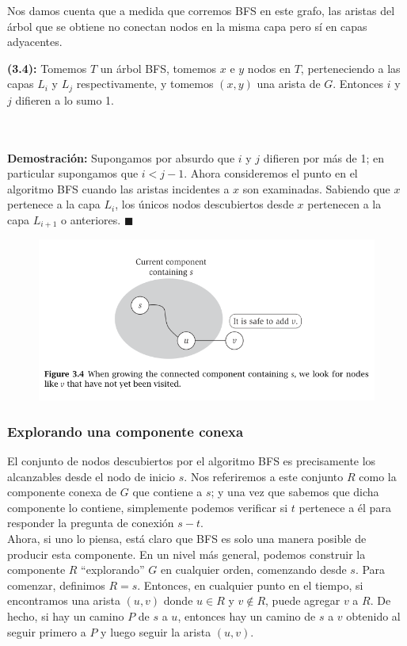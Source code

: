 \documentclass[a4paper, 12pt]{book}
\theoremstyle{dotless}
\begin{document}
Nos damos cuenta que a medida que corremos BFS en este grafo, las aristas del árbol que se obtiene no conectan nodos en la misma capa pero sí en capas adyacentes. \\

 \colorbox{mygray}{\parbox{15cm}{
	\textbf{(3.4):} Tomemos $T$ un árbol BFS, tomemos $x$ e  $y$ nodos en $T$, perteneciendo a las capas $L_i$ y $L_j$ respectivamente, y tomemos $(x,y)$ una arista de $G$. Entonces $i$ y $j$ difieren a lo sumo 1.}}\\\\
  
\textbf{Demostración:} Supongamos por absurdo que $i$ y $j$ difieren por más de 1; en particular supongamos que $i < j - 1$. Ahora consideremos el punto en el algoritmo BFS cuando las aristas incidentes a $x$ son examinadas. Sabiendo que $x$ pertenece a la capa $L_i$, los únicos nodos descubiertos desde $x$ pertenecen a la capa $L_{i+1}$ o anteriores. $ \blacksquare $ 

\begin{figure}[h]
\centering
\includegraphics[scale=1]{Imagenes-Seccion3/fig3_3.PNG}
\caption{}
\end{figure}

\subsubsection*{Explorando una componente conexa}  

El conjunto de nodos descubiertos por el algoritmo BFS es precisamente los alcanzables desde el nodo de inicio $s$. Nos referiremos a este conjunto $R$ como la componente conexa de $G$ que contiene a $s$; y una vez que sabemos que dicha componente lo contiene, simplemente podemos verificar si $t$ pertenece a él para responder la pregunta de conexión $s-t$. \\

Ahora, si uno lo piensa, está claro que BFS es solo una manera posible de
producir esta componente. En un nivel más general, podemos construir la componente
$R$ ``explorando'' $G$ en cualquier orden, comenzando desde $s$. Para comenzar, definimos $R = {s}$. Entonces, en cualquier punto en el tiempo, si encontramos una arista $(u, v)$ donde $u  \in  R$ y \(v \notin  R\), puede agregar $v$ a $R$. De hecho, si hay un camino $P$ de $s$ a $u$, entonces hay un camino de $s$ a $v$ obtenido al seguir primero a $P$ y luego seguir la arista $(u, v)$. \\
\end{document}
